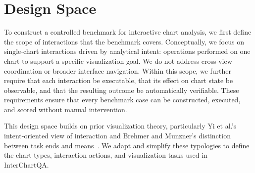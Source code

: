 \documentclass[review,journal,hideappendix]{vgtc} %
\newcommand{\dataset}{InterChartQA}
\begin{document}
\section{Design Space}


To construct a controlled benchmark for interactive chart analysis, we first define the scope of interactions that the benchmark covers. Conceptually, we focus on single-chart interactions driven by analytical intent: operations performed on one chart to support a specific visualization goal. We do not address cross-view coordination or broader interface navigation. Within this scope, we further require that each interaction be executable, that its effect on chart state be observable, and that the resulting outcome be automatically verifiable. These requirements ensure that every benchmark case can be constructed, executed, and scored without manual intervention.

This design space builds on prior visualization theory, particularly Yi et al.'s intent-oriented view of interaction and Brehmer and Munzner's distinction between task ends and means~\cite{yiDeeperUnderstandingRole2007, brehmerMultilevelTypologyAbstract2013}. We adapt and simplify these typologies to define the chart types, interaction actions, and visualization tasks used in \dataset{}.
\end{document}

